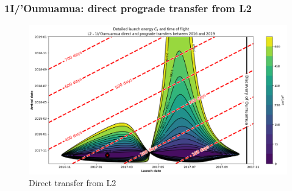 \documentclass[xcolor={dvipsnames}]{beamer}
\begin{document}
\begin{frame}
\frametitle{1I/'Oumuamua: direct prograde transfer from L2}

\begin{figure}[h]
    \centering
    \includegraphics[width=\textwidth]{fig/static/oumuamua/l2-direct-detailed-porkchop-tof.png}
    \caption{Direct transfer from L2}
    \label{fig:oumuamua-l2-transfer}
\end{figure}

\end{frame}
\end{document}
